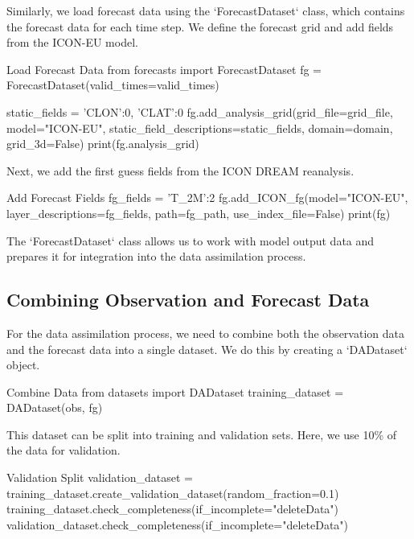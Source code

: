 Similarly, we load forecast data using the `ForecastDataset` class, which contains the forecast data for each time step. We define the forecast grid and add fields from the ICON-EU model.

\begin{codeonly}{Load Forecast Data}
from forecasts import ForecastDataset
fg = ForecastDataset(valid_times=valid_times)

static_fields = {'CLON':0, 'CLAT':0}
fg.add_analysis_grid(grid_file=grid_file, model="ICON-EU", static_field_descriptions=static_fields, domain=domain, grid_3d=False)
print(fg.analysis_grid)
\end{codeonly}

Next, we add the first guess fields from the ICON DREAM reanalysis.

\begin{codeonly}{Add Forecast Fields}
fg_fields = {'T_2M':2}
fg.add_ICON_fg(model="ICON-EU", layer_descriptions=fg_fields, path=fg_path, use_index_file=False)
print(fg)
\end{codeonly}

The `ForecastDataset` class allows us to work with model output data and prepares it for integration into the data assimilation process.

%
\subsection{Combining Observation and Forecast Data}

For the data assimilation process, we need to combine both the observation data and the forecast data into a single dataset. We do this by creating a `DADataset` object.

\begin{codeonly}{Combine Data}
from datasets import DADataset
training_dataset = DADataset(obs, fg)
\end{codeonly}

This dataset can be split into training and validation sets. Here, we use 10\% of the data for validation.

\begin{codeonly}{Validation Split}
validation_dataset = training_dataset.create_validation_dataset(random_fraction=0.1)
training_dataset.check_completeness(if_incomplete="deleteData")
validation_dataset.check_completeness(if_incomplete="deleteData")
\end{codeonly}

